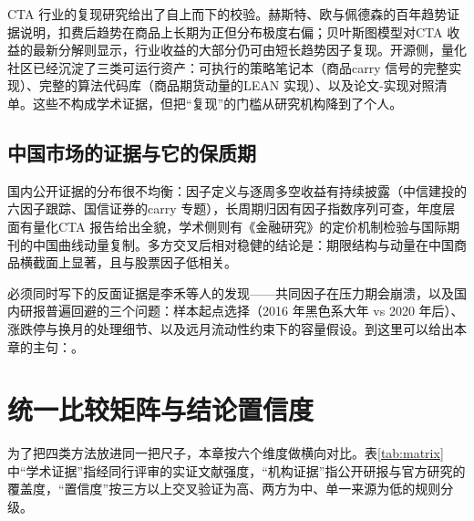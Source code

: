 \documentclass[12pt,a4paper]{ctexart}
\begin{document}
CTA 行业的复现研究给出了自上而下的校验。赫斯特、欧与佩德森的百年趋势证据说明，扣费后趋势在商品上长期为正但分布极度右偏\cite{37}；贝叶斯图模型对CTA 收益的最新分解则显示，行业收益的大部分仍可由短长趋势因子复现\cite{93}。开源侧，量化社区已经沉淀了三类可运行资产：可执行的策略笔记本（商品carry 信号的完整实现\cite{94}）、完整的算法代码库（商品期货动量的LEAN 实现\cite{95}）、以及论文-实现对照清单\cite{96}。这些不构成学术证据，但把“复现”的门槛从研究机构降到了个人。

\subsection{中国市场的证据与它的保质期}

国内公开证据的分布很不均衡：因子定义与逐周多空收益有持续披露（中信建投的六因子跟踪\cite{58}、国信证券的carry 专题\cite{61}），长周期归因有因子指数序列可查\cite{60}，年度层面有量化CTA 报告给出全貌\cite{100}，学术侧则有《金融研究》的定价机制检验\cite{87, 88}与国际期刊的中国曲线动量复制\cite{90}。多方交叉后相对稳健的结论是：期限结构与动量在中国商品横截面上显著，且与股票因子低相关。

必须同时写下的反面证据是李禾等人的发现——共同因子在压力期会崩溃\cite{89}，以及国内研报普遍回避的三个问题：样本起点选择（2016 年黑色系大年 vs 2020 年后）、涨跌停与换月的处理细节、以及远月流动性约束下的容量假设。到这里可以给出本章的主句：。

\section{统一比较矩阵与结论置信度}

为了把四类方法放进同一把尺子，本章按六个维度做横向对比。表\ref{tab:matrix} 中“学术证据”指经同行评审的实证文献强度，“机构证据”指公开研报与官方研究的覆盖度，“置信度”按三方以上交叉验证为高、两方为中、单一来源为低的规则分级。
\end{document}

